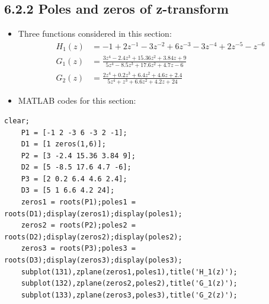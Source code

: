 \documentclass[onecolumn,oneside]{SUSTechHomework}
\begin{document}
\subsection*{6.2.2 Poles and zeros of z-transform}
\begin{itemize}
    \item Three functions considered in this section:
    $$
    \begin{aligned}
        H_{1}(z)&=-1+2 z^{-1}-3 z^{-2}+6 z^{-3}-3 z^{-4}+2 z^{-5}-z^{-6} \\
        G_{1}(z)&=\frac{3 z^{4}-2.4 z^{3}+15.36 z^{2}+3.84 z+9}{5 z^{4}-8.5 z^{3}+17.6 z^{2}+4.7 z-6} \\
        G_{2}(z)&=\frac{2 z^{4}+0.2 z^{3}+6.4 z^{2}+4.6 z+2.4}{5 z^{4}+z^{3}+6.6 z^{2}+4.2 z+24}
    \end{aligned}
    $$
    \item MATLAB codes for this section:
\end{itemize}
\begin{lstlisting}[title=\textbf{q6\_2\_2.m}]
    clear;
    P1 = [-1 2 -3 6 -3 2 -1];
    D1 = [1 zeros(1,6)];
    P2 = [3 -2.4 15.36 3.84 9];
    D2 = [5 -8.5 17.6 4.7 -6];
    P3 = [2 0.2 6.4 4.6 2.4];
    D3 = [5 1 6.6 4.2 24];
    zeros1 = roots(P1);poles1 = roots(D1);display(zeros1);display(poles1);
    zeros2 = roots(P2);poles2 = roots(D2);display(zeros2);display(poles2);
    zeros3 = roots(P3);poles3 = roots(D3);display(zeros3);display(poles3);
    subplot(131),zplane(zeros1,poles1),title('H_1(z)');
    subplot(132),zplane(zeros2,poles2),title('G_1(z)');
    subplot(133),zplane(zeros3,poles3),title('G_2(z)');
\end{lstlisting}
\end{document}
